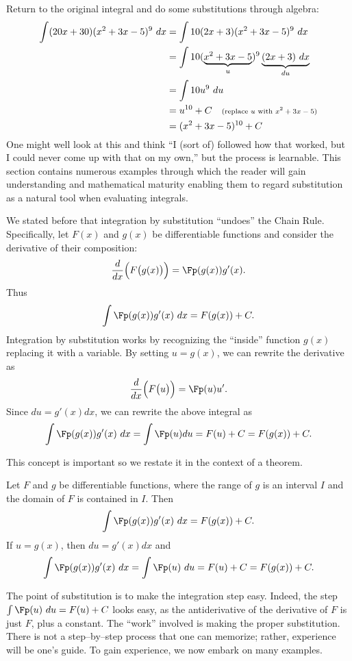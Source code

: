 Return to the original integral and do some substitutions through algebra:
\begin{align*}
	\int (20x+30)(x^2+3x-5)^9\ dx 	&=	\int 10(2x+3)(x^2+3x-5)^9\ dx \\
									&=\int 10(\underbrace{x^2+3x-5}_u)^9\underbrace{(2x+3)\ dx}_{du} \\
									&=\int 10u^9\ du \\
									&= u^{10} + C \quad \text{\scriptsize (replace $u$ with $x^2+3x-5$)}\\
									&= (x^2+3x-5)^{10} +C
\end{align*}
One might well look at this and think ``I (sort of) followed how that worked, but I could never come up with that on my own,'' but the process is learnable. This section contains numerous examples through which the reader will gain understanding and mathematical maturity enabling them to regard substitution as a natural tool when evaluating integrals.

We stated before that integration by substitution ``undoes'' the Chain Rule. Specifically, let $F(x)$ and $g(x)$ be differentiable functions and consider the derivative of their composition: 
	$$\frac{d}{dx}\Big(F\big(g(x)\big)\Big) = \Fp(g(x))g'(x).$$ Thus 
	$$\int \Fp(g(x))g'(x)\ dx = F(g(x)) + C.$$
Integration by substitution works by recognizing the ``inside'' function $g(x)$ replacing it with a variable. By setting $u=g(x)$, we can rewrite the derivative as
	$$\frac{d}{dx}\Big(F\big(u\big)\Big) = \Fp(u)u'.$$
Since $du = g'(x)dx$, we can rewrite the above integral as
	$$\int \Fp(g(x))g'(x)\ dx = \int \Fp(u) du = F(u)+C = F(g(x))+ C.$$
	
This concept is important so we restate it in the context of a theorem.

{Let $F$ and $g$ be differentiable functions, where the range of $g$ is an interval $I$ and the domain of $F$ is contained in $I$. Then 
	$$\int \Fp(g(x))g'(x)\ dx = F(g(x)) + C.$$
If $u = g(x)$, then $du = g'(x)dx$ and 
	$$\int \Fp(g(x))g'(x)\ dx = \int \Fp(u)\ du = F(u)+C = F(g(x))+C.$$
}

The point of substitution is to make the integration step easy. Indeed, the step $\int \Fp(u)\ du = F(u) + C$ looks easy, as the antiderivative of the derivative of $F$ is just $F$, plus a constant. The ``work'' involved is making the proper substitution. There is not a step--by--step process that one can memorize; rather, experience will be one's guide. To gain experience, we now embark on many examples.\\

